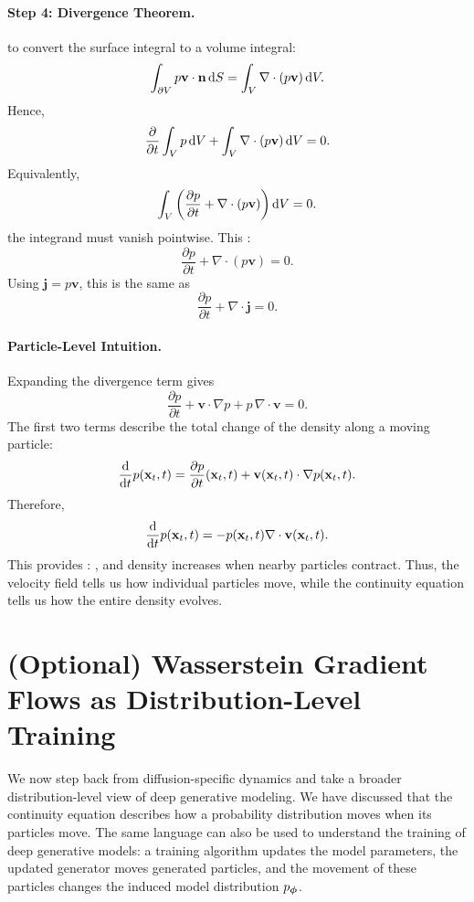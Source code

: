 \paragraph{Step 4: Divergence Theorem.}  
  to convert the surface integral to a volume integral:
\[
\int_{\partial V} p \mathbf{v} \cdot \mathbf{n} \mathop{}\!\mathrm{d} S = \int_V \nabla \cdot (p \mathbf{v}) \mathop{}\!\mathrm{d} V.
\]
Hence,
\[
\frac{\partial}{\partial t} \int_V p \mathop{}\!\mathrm{d} V + \int_V \nabla \cdot (p \mathbf{v}) \mathop{}\!\mathrm{d} V = 0.
\]
Equivalently,
\[
\int_V \left(\frac{\partial p}{\partial t}+\nabla\cdot(p\mathbf{v})\right)\mathop{}\!\mathrm{d} V=0.
\]
 the integrand must vanish pointwise. This :
\[
\frac{\partial p}{\partial t}+\nabla\cdot(p\mathbf{v})=0.
\]
Using $\mathbf{j}=p\mathbf{v}$, this is the same as
\[
\frac{\partial p}{\partial t}+\nabla\cdot\mathbf{j}=0.
\]


\paragraph{Particle-Level Intuition.}
Expanding the divergence term gives
\[
\frac{\partial p}{\partial t}
+
\mathbf{v}\cdot\nabla p
+
p\,\nabla\cdot\mathbf{v}
=
0.
\]
The first two terms describe the total change of the density along a moving particle:
\[
\frac{\mathop{}\!\mathrm{d}}{\mathop{}\!\mathrm{d} t}p(\mathbf{x}_t,t)
=
\frac{\partial p}{\partial t}(\mathbf{x}_t,t)
+
\mathbf{v}(\mathbf{x}_t,t)\cdot\nabla p(\mathbf{x}_t,t).
\]
Therefore,
\[
\frac{\mathop{}\!\mathrm{d}}{\mathop{}\!\mathrm{d} t}p(\mathbf{x}_t,t)
=
-
p(\mathbf{x}_t,t)\nabla\cdot\mathbf{v}(\mathbf{x}_t,t).
\]
This provides : , and density increases when nearby particles contract. Thus, the velocity field tells us how individual particles move, while the continuity equation tells us how the entire density evolves.

\clearpage
\newpage

\section{(Optional) Wasserstein Gradient Flows as Distribution-Level Training}
\label{sec:wgf-distribution-level-training}

We now step back from diffusion-specific dynamics and take a broader
distribution-level view of deep generative modeling.  We have discussed that the continuity equation describes how a probability
distribution moves when its particles move.   The same language can also be used
to understand the training of deep generative models: a training algorithm updates
the model parameters, the updated generator moves generated particles, and the
movement of these particles changes the induced model distribution
$p_{{\bm{\phi}}}$.

